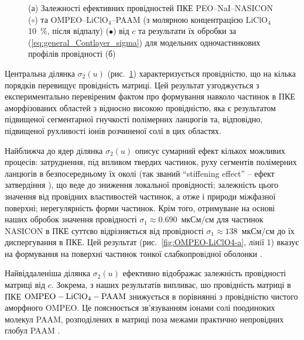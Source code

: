\documentclass[twoside,a4paper,14pt]{vakaref-utf8}
\begin{document}
\begin{figure}[bt]
\begin{subfigure}[c]{0.38\textwidth}
		\caption{} \label{fig:OMPEO-LiClO4-b}
	\end{subfigure}
	\caption{\label{fig:PEO-NaI} 
		(а) Залежності ефективних провідностей ПКЕ PEO--NaI--NASICON \cite{Przl1995} ($\circ$) та OMPEO--LiClO$_4$--PAAM (з молярною концентрацією LiClO$_4$ 10~\%, після відпалу)
		\cite{Wiec1994} ($\bullet$) від $c$ та результати їх обробки за (\ref{eq:general_Contlayer_sigma}) для модельних одночастинкових профілів провідності (б)}
\vspace{-10pt}
\end{figure}

Центральна ділянка $\sigma_2(u)$ (рис.~\ref{fig:OMPEO-LiClO4-b}) характеризується провідністю, що на кілька порядків перевищує провідність матриці. Цей результат узгоджується з експериментально перевіреним фактом \cite{nanocomp2008} про формування навколо частинок в ПКЕ аморфізованих областей з відносно високою провідністю, яка є результатом підвищеної сегментарної гнучкості полімерних ланцюгів та, відповідно, підвищеної рухливості іонів розчиненої солі в цих областях. 

Найближча до ядер  ділянка $\sigma_2(u)$ описує сумарний ефект кількох можливих процесів: затруднення, під впливом твердих частинок, руху сегментів полімерних ланцюгів  в безпосередньому їх околі (так званий ``stiffening effect'' -- ефект затвердіння \cite{Wiec1994}), що веде до зниження локальної провідності; залежність цього значення від провідних властивостей частинок, а отже і природи міжфазної поверхні; нерегулярність форми частинок. Крім того, отримуване на основі наших обробок значення провідності $\sigma_1\approx 0.690$~мкСм/см для частинок NASICON в ПКЕ суттєво відрізняється від провідності $\sigma_1\approx 138$~мкСм/см до їх диспергування в ПКЕ. Цей результат (рис.~\ref{fig:OMPEO-LiClO4-a}, лiнiї 1) вказує на формування на поверхні частинок тонкої слабкопровiдної оболонки \cite{Ploch1988}. 

Найвіддаленіша ділянка $\sigma_2(u)$ ефективно відображає залежність провідності матриці від $c$. Зокрема, з наших результатів випливає, шо провідність  матриці в  ПКЕ $\rm OMPEO-LiClO_4-PAAM$ знижується в порівнянні з провідністю чистого аморфного OMPEO. Це пояснюється зв'язуванням іонами солі поодиноких молекул PAAM, розподілених в матриці поза межами практично непровідних глобул PAAM \cite{Wiec1994}.
\end{document}
